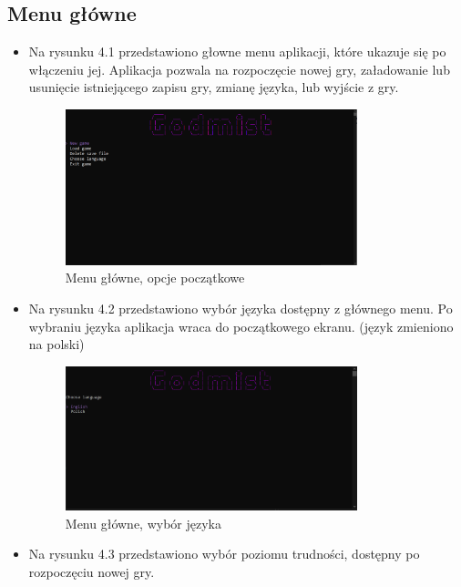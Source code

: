 \subsection{Menu główne}
\begin{itemize}
    \item Na rysunku 4.1 przedstawiono głowne menu aplikacji, które ukazuje się po włączeniu jej. 
    Aplikacja pozwala na rozpoczęcie nowej gry, załadowanie lub usunięcie istniejącego zapisu gry, zmianę języka, lub wyjście z gry.
        \begin{figure}[H]
            \centering
            \includegraphics[width=0.8\textwidth]{figures/warstwa_uzytkowa/menu_glowne_1.png}
            \caption{Menu główne, opcje początkowe}
            \label{fig:main_menu_1}
        \end{figure}
        \item Na rysunku 4.2 przedstawiono wybór języka dostępny z głównego menu. Po wybraniu języka aplikacja wraca do początkowego ekranu. 
        (język zmieniono na polski)
            \begin{figure}[H]
                \centering
                \includegraphics[width=0.8\textwidth]{figures/warstwa_uzytkowa/menu_glowne_2.png}
                \caption{Menu główne, wybór języka}
                \label{fig:main_menu_2}
            \end{figure}
        \item Na rysunku 4.3 przedstawiono wybór poziomu trudności, dostępny po rozpoczęciu nowej gry.

\end{itemize}
